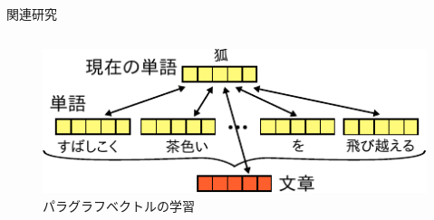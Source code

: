 \documentclass[unicode,10pt]{beamer}
\begin{document}
\begin{frame}[t]
\begin{block}{関連研究}
\begin{columns}[onlytextwidth,t]
    \begin{column}{0.425\textwidth}
      \begin{figure}
        \includegraphics[width=0.95\linewidth]{fig/paragraph_vector.pdf}
        \caption*{パラグラフベクトルの学習}
      \end{figure}
    \end{column}
  \end{columns}
\end{block}


\end{frame}
\end{document}
